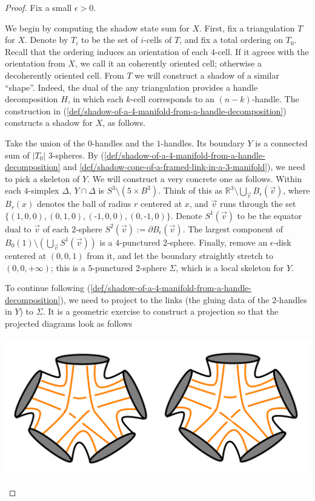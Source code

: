 \begin{proof}
  Fix a small $\epsilon > 0$.

  We begin by computing the shadow state sum for $X$. First, fix
  a triangulation $T$ for $X$. Denote by $T_{i}$ to be the set of
  $i$-cells of $T$, and fix a total ordering on $T_{0}$. Recall
  that the ordering induces an orientation of each $4$-cell. If
  it agrees with the orientation from $X$, we call it an
  coherently oriented cell; otherwise a decoherently oriented
  cell. From $T$ we will construct a shadow of a similar
  ``shape''. Indeed, the dual of the any triangulation provides a
  handle decomposition $H$, in which each $k$-cell corresponds to
  an $(n-k)$-handle. The construction in
  (\ref{def/shadow-of-a-4-manifold-from-a-handle-decomposition})
  constructs a shadow for $X$, as follows.

  Take the union of the $0$-handles and the $1$-handles. Its
  boundary $Y$ is a connected sum of $|T_{0}|$ $3$-spheres. By
  (\ref{def/shadow-of-a-4-manifold-from-a-handle-decomposition}
  and \ref{def/shadow-cone-of-a-framed-link-in-a-3-manifold}), we
  need to pick a skeleton of $Y$. We will construct a very
  concrete one as follows. Within each $4$-simplex $\Delta$,
  $Y \cap \Delta$ is $S^{3} \setminus (5 \times B^{3})$. Think of
  this as
  $\mathbb{R}^{3} \setminus \bigcup_{\vec{v}} B_{\epsilon}(\vec{v})$,
  where $B_{r}(x)$ denotes the ball of radius $r$ centered at
  $x$, and $\vec{v}$ runs through the set
  $\{(1,0,0), (0,1,0), (\text{-}1,0,0), (0,\text{-}1,0)\}$.
  Denote $S^{1}(\vec{v})$ to be the equator dual to $\vec{v}$ of
  each $2$-sphere
  $S^{2}(\vec{v}) := \partial B_{\epsilon}(\vec{v})$. The largest
  component of
  $B_{0}(1) \setminus \left(\bigcup_{\vec{v}}S^{1}(\vec{v})\right)$
  is a $4$-punctured $2$-sphere. Finally, remove an
  $\epsilon$-disk centered at $(0,0,1)$ from it, and let the
  boundary straightly stretch to $(0,0,+\infty)$; this is a
  $5$-punctured $2$-sphere $\Sigma$, which is a local skeleton
  for $Y$.

  To continue following
  (\ref{def/shadow-of-a-4-manifold-from-a-handle-decomposition}),
  we need to project to the links (the gluing data of the
  $2$-handles in $Y$) to $\Sigma$. It is a geometric exercise to
  construct a projection so that the projected diagrams look as
  follows

  \begin{center}
    \includegraphics[height=6cm]{main-shadow}
  \end{center}


\end{proof}
